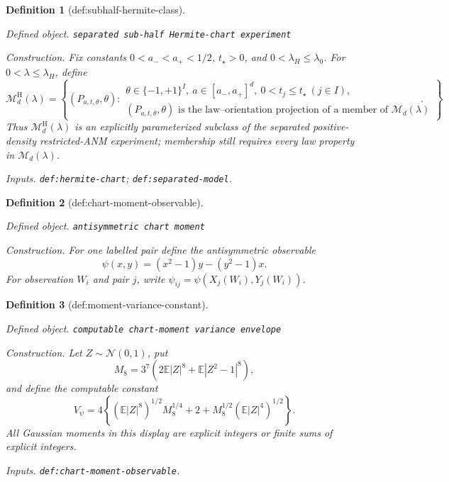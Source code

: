 \documentclass{article}
\newtheorem{definition}{Definition}
\begin{document}
\begin{definition}[def:subhalf-hermite-class]\label{def:subhalf-hermite-class}
\par\smallskip\noindent\emph{Defined object.} \texttt{separated sub-\allowbreak{}half Hermite-\allowbreak{}chart experiment}
\par\smallskip\noindent\emph{Construction.} Fix constants \(0<a_-<a_+<1/2\), \(t_\star>0\), and \(0<\lambda_H\le\lambda_0\).  For \(0<\lambda\le\lambda_H\), define
\[
\mathcal M_d^{\mathrm H}(\lambda)
=\left\{(P_{a,t,\theta},\theta):
\begin{array}{l}
\theta\in\{-1,+1\}^{I},\ a\in[a_-,a_+]^d,\ 0<t_j\le t_\star\ (j\in I),\\
(P_{a,t,\theta},\theta)\text{ is the law--orientation projection of a member of }\mathcal M_d(\lambda)
\end{array}
\right\}.
\]
Thus \(\mathcal M_d^{\mathrm H}(\lambda)\) is an explicitly parameterized subclass of the separated positive-density restricted-ANM experiment; membership still requires every law property in \(\mathcal M_d(\lambda)\).
\par\smallskip\noindent\emph{Inputs.} \texttt{def:\allowbreak{}hermite-\allowbreak{}chart}; \texttt{def:\allowbreak{}separated-\allowbreak{}model}.
\end{definition}

\begin{definition}[def:chart-moment-observable]\label{def:chart-moment-observable}
\par\smallskip\noindent\emph{Defined object.} \texttt{antisymmetric chart moment}
\par\smallskip\noindent\emph{Construction.} For one labelled pair define the antisymmetric observable
\[
\psi(x,y)=(x^2-1)y-(y^2-1)x.
\]
For observation \(W_i\) and pair \(j\), write \(\psi_{ij}=\psi(X_j(W_i),Y_j(W_i))\).
\end{definition}

\begin{definition}[def:moment-variance-constant]\label{def:moment-variance-constant}
\par\smallskip\noindent\emph{Defined object.} \texttt{computable chart-\allowbreak{}moment variance envelope}
\par\smallskip\noindent\emph{Construction.} Let \(Z\sim\mathcal N(0,1)\), put
\[
M_8=3^7\left(2\mathbb E|Z|^8+\mathbb E|Z^2-1|^8\right),
\]
and define the computable constant
\[
V_\psi=4\left\{(\mathbb E|Z|^8)^{1/2}M_8^{1/4}+2+M_8^{1/2}(\mathbb E|Z|^4)^{1/2}\right\}.
\]
All Gaussian moments in this display are explicit integers or finite sums of explicit integers.
\par\smallskip\noindent\emph{Inputs.} \texttt{def:\allowbreak{}chart-\allowbreak{}moment-\allowbreak{}observable}.
\end{definition}
\end{document}
